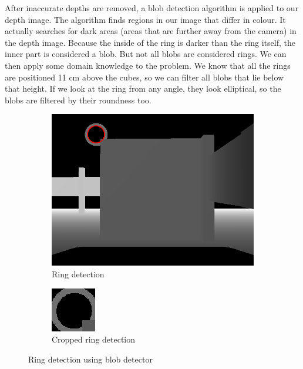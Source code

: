 \documentclass[12pt,a4paper]{article}
\begin{document}
	After inaccurate depths are removed, a blob detection algorithm is applied to our depth image. The algorithm finds regions in our image that differ in colour. It actually searches for dark areas (areas that are further away from the camera) in the depth image. Because the inside of the ring is darker than the ring itself, the inner part is considered a blob. But not all blobs are considered rings. We can then apply some domain knowledge to the problem. We know that all the rings are positioned 11 cm above the cubes, so we can filter all blobs that lie below that height. If we look at the ring from any angle, they look elliptical, so the blobs are filtered by their roundness too. \\
	
	\begin{figure}[h]
		\begin{subfigure}{.5\textwidth}
			\centering
			\includegraphics[width=.8\linewidth]{images/ring_detection}
			\caption{Ring detection}
			\label{fig:detected_ring}
		\end{subfigure}
		\begin{subfigure}{.5\textwidth}
			\centering
			\includegraphics[width=.8\linewidth]{images/ring_detection_cropped}
			\caption{Cropped ring detection}
			\label{fig:detected_ring_cropped}
		\end{subfigure}
		\caption{Ring detection using blob detector}
		\label{fig:ring_detection}
	\end{figure}
\end{document}
